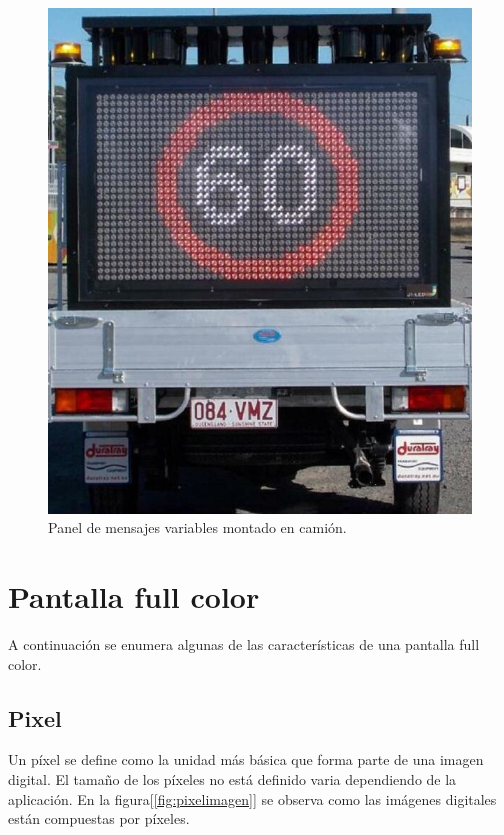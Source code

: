 \begin{figure}[htpb]
	\centering
	\includegraphics[scale=1]{../Figures/vmstruck.png} 
	\caption{Panel de mensajes variables montado en camión\protect\footnotemark.}
	\label{fig:vmsc}
\end{figure}


\section{Pantalla full color}
A continuación se enumera algunas de las características de una pantalla full color.
\subsection{Pixel}
Un píxel se define como la unidad más básica que forma parte de una imagen digital.
El tamaño de los píxeles no está definido varia dependiendo de la aplicación\citep{IMAGENDEF}. En la figura[\ref{fig:pixelimagen}] se observa como las imágenes digitales están compuestas por píxeles.

